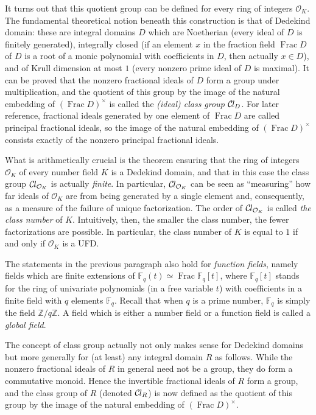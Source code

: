 \documentclass[sn-mathphys]{sn-jnl}%
\newcommand*{\OK}[1][K]{\mathcal{O}_{#1}}
\newcommand*{\Cl}{\mathcal{C}\kern-.075em l}
\newcommand*{\Fq}[1][q]{\mathbb{F}_{#1}}
\renewcommand{\Z}{\mathbb{Z}}
\DeclareMathOperator{\Frac}{Frac}
\begin{document}
It turns out that this quotient group can be defined for every ring of integers $\OK$.
The fundamental theoretical notion beneath this construction is that of Dedekind domain: these are integral domains $D$ which are Noetherian (every ideal of $D$ is finitely generated), integrally closed (if an element $x$ in the fraction field $\Frac D$ of $D$ is a root of a monic polynomial with coefficients in $D$, then actually $x \in D$), and of Krull dimension at most $1$ (every nonzero prime ideal of $D$ is maximal).
It can be proved that the nonzero fractional ideals of $D$
form a group under multiplication, and the quotient of this group by the image of the natural embedding of $(\Frac D)^\times$ is called the \emph{\textup{(}ideal\textup{)} class group} $\Cl_{D}$.
For later reference, fractional ideals generated by one element of $\Frac D$ are called principal fractional ideals, so the image of the natural embedding of $(\Frac D)^\times$ consists exactly of the nonzero principal fractional ideals.

What is arithmetically crucial is the theorem ensuring that the ring of integers $\OK$ of every number field $K$ is a Dedekind domain,
and that in this case the class group $\Cl_{\OK}$ is actually \emph{finite}.
In particular, $\Cl_{\OK}$ can be seen as ``measuring'' how far ideals of $\OK$ are from being generated by a single element and,
consequently, as a measure of the failure of unique factorization.
The order of $\Cl_{\OK}$ is called \emph{the class number} of $K$.
Intuitively, then, the smaller the class number, the fewer factorizations are possible.
In particular, the class number of $K$ is equal to $1$ if and only if $\OK$ is a UFD.

The statements in the previous paragraph also hold for \emph{function fields}, namely fields which are finite extensions of $\Fq(t) \simeq \Frac \Fq[q][t]$, where $\Fq[q][t]$ stands for the ring of univariate polynomials (in a free variable $t$) with coefficients in a finite field with $q$ elements $\Fq$. Recall that when $q$ is a prime number, $\Fq$ is simply the field $\Z/q\Z$.
A field which is either a number field or a function field is called a \emph{global field}.

The concept of class group actually not only makes sense for Dedekind domains but more generally for (at least) any integral domain $R$ as follows. While the nonzero fractional ideals of $R$ in general need not be a group, they do form a commutative monoid. Hence the invertible fractional ideals of $R$ form a group, and the class group of $R$ (denoted $\Cl_{R}$) is now defined as the quotient of this group by the image of the natural embedding of $(\Frac D)^\times$.
\end{document}
